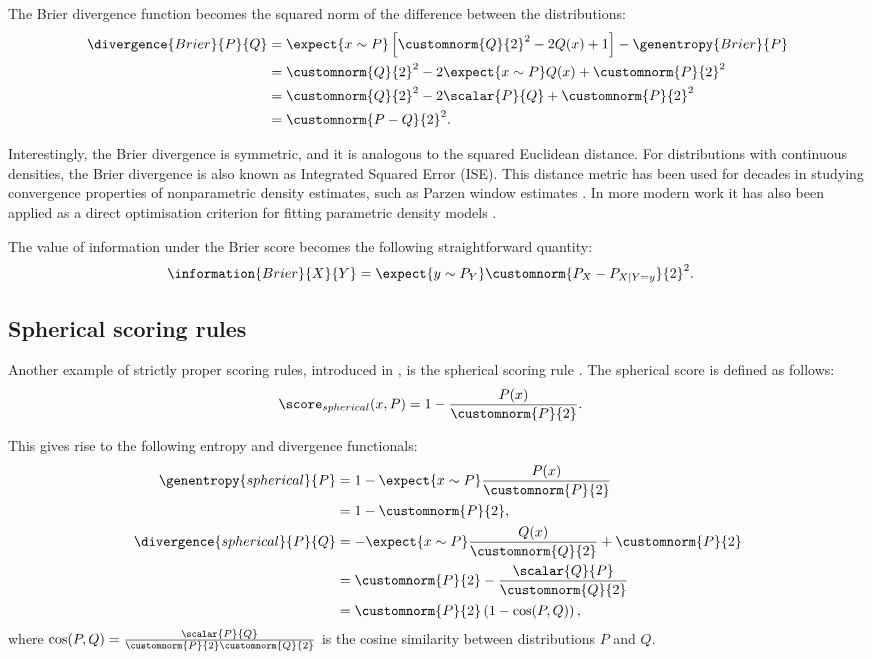 The Brier divergence function becomes the squared norm of the difference between the distributions:
%
\begin{align}
	\divergence{Brier}{P}{Q} &= \expect{x \sim P}\left[\customnorm{Q}{2}^2 - 2Q(x) + 1\right] - \genentropy{Brier}{P} \\
		&= \customnorm{Q}{2}^2 -2 \expect{x \sim P} Q(x) + \customnorm{P}{2}^2 \\
		&= \customnorm{Q}{2}^2 - 2\scalar{P}{Q} + \customnorm{P}{2}^2\\
		&= \customnorm{P-Q}{2}^2. \label{eqn:Brier_divergence}
\end{align}

\cbstart
Interestingly, the Brier divergence is symmetric, and it is analogous to the squared Euclidean distance. For distributions with continuous densities, the Brier divergence is also known as Integrated Squared Error (ISE). This distance metric has been used for decades in studying convergence properties of nonparametric density estimates, such as Parzen window estimates \citep{Parzen62}. In more modern work it has also been applied as a direct optimisation criterion for fitting parametric density models \citep[see \eg][]{Scott99,Mukherjee99,Girolami03}.
\cbend

The value of information under the Brier score becomes the following straightforward quantity:
%
\begin{align}
	\information{Brier}{X}{Y} &= \expect{y \sim P_{Y}} \customnorm{P_X - P_{X\vert Y=y}}{2}^2.
\end{align}

\subsection{Spherical scoring rules}

Another example of strictly proper scoring rules, introduced in \citep{Good1971}, is the spherical scoring rule \citep{Dawid2007,Dawid2012}. The spherical score is defined as follows:
%
\begin{align}
	\score_{spherical}(x,P) &= 1 -\frac{P(x)}{\customnorm{P}{2}}.
\end{align}

This gives rise to the following entropy and divergence functionals:
%
\begin{align}
	\genentropy{spherical}{P} &= 1 -\expect{x \sim P}\frac{P(x)}{\customnorm{P}{2}}\\
		&= 1 -\customnorm{P}{2},\\
	\divergence{spherical}{P}{Q} &= -\expect{x \sim P}\frac{Q(x)}{\customnorm{Q}{2}} + \customnorm{P}{2}\\
		&= \customnorm{P}{2} - \frac{\scalar{Q}{P}}{\customnorm{Q}{2}}\\
		&= \customnorm{P}{2}\left( 1 - \cos(P,Q) \right),
\end{align}
%
where $\cos(P,Q) = \frac{\scalar{P}{Q}}{\customnorm{P}{2}\customnorm{Q}{2}}$ is the cosine similarity between distributions $P$ and $Q$.

